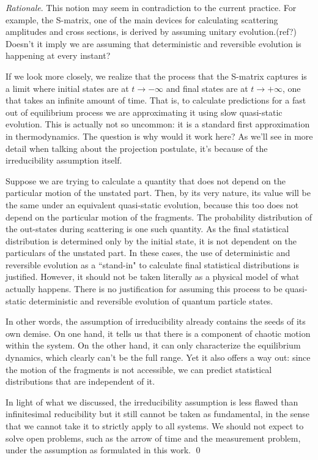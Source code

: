 \documentclass[aps,pra,10pt,twocolumn,floatfix,nofootinbib]{revtex4-1}
\numberwithin{equation}{section}
\theoremstyle{definition}
\newenvironment{rationale}{\emph{Rationale}.}{\qed}
\begin{document}
\begin{rationale}
	This notion may seem in contradiction to the current practice. For example, the S-matrix, one of the main devices for calculating scattering amplitudes and cross sections, is derived by assuming unitary evolution.(ref?) Doesn't it imply we are assuming that deterministic and reversible evolution is happening at every instant?
	
	If we look more closely, we realize that the process that the S-matrix captures is a limit where initial states are at $t \rightarrow - \infty$ and final states are at $t \rightarrow + \infty$, one that takes an infinite amount of time.  That is, to calculate predictions for a fast out of equilibrium process we are approximating it using slow quasi-static evolution. This is actually not so uncommon: it is a standard first approximation in thermodynamics. The question is why would it work here? As we'll see in more detail when talking about the projection postulate, it's because of the irreducibility assumption itself.
	
	Suppose we are trying to calculate a quantity that does not depend on the particular motion of the unstated part. Then, by its very nature, its value will be the same under an equivalent quasi-static evolution, because this too does not depend on the particular motion of the fragments. The probability distribution of the out-states during scattering is one such quantity. As the final statistical distribution is determined only by the initial state, it is not dependent on the particulars of the unstated part. In these cases, the use of deterministic and reversible evolution as a ``stand-in" to calculate final statistical distributions is justified. However, it should not be taken literally as a physical model of what actually happens. There is no justification for assuming this process to be quasi-static deterministic and reversible evolution of quantum particle states.
	
	In other words, the assumption of irreducibility already contains the seeds of its own demise. On one hand, it tells us that there is a component of chaotic motion within the system. On the other hand, it can only characterize the equilibrium dynamics, which clearly can't be the full range. Yet it also offers a way out: since the motion of the fragments is not accessible, we can predict statistical distributions that are independent of it.
	
	In light of what we discussed, the irreducibility assumption is less flawed than infinitesimal reducibility but it still cannot be taken as fundamental, in the sense that we cannot take it to strictly apply to all systems. We should not expect to solve open problems, such as the arrow of time and the measurement problem, under the assumption as formulated in this work.
\end{rationale}
\end{document}
